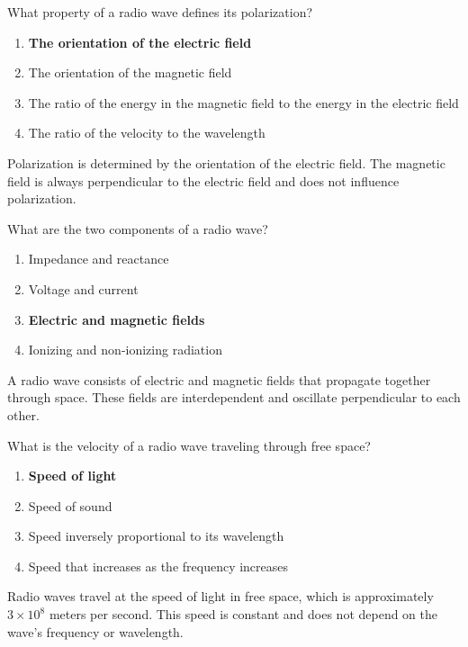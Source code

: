 \begin{tcolorbox}[colback=gray!10!white,colframe=black!75!black,title={T3B02}]
    What property of a radio wave defines its polarization?
    \begin{enumerate}[label=\Alph*,noitemsep]
        \item \textbf{The orientation of the electric field}
        \item The orientation of the magnetic field
        \item The ratio of the energy in the magnetic field to the energy in the electric field
        \item The ratio of the velocity to the wavelength
    \end{enumerate}
\end{tcolorbox}
Polarization is determined by the orientation of the electric field. The magnetic field is always perpendicular to the electric field and does not influence polarization.


\begin{tcolorbox}[colback=gray!10!white,colframe=black!75!black,title={T3B03}]
    What are the two components of a radio wave?
    \begin{enumerate}[label=\Alph*,noitemsep]
        \item Impedance and reactance
        \item Voltage and current
        \item \textbf{Electric and magnetic fields}
        \item Ionizing and non-ionizing radiation
    \end{enumerate}
\end{tcolorbox}
A radio wave consists of electric and magnetic fields that propagate together through space. These fields are interdependent and oscillate perpendicular to each other.


\begin{tcolorbox}[colback=gray!10!white,colframe=black!75!black,title={T3B04}]
    What is the velocity of a radio wave traveling through free space?
    \begin{enumerate}[label=\Alph*,noitemsep]
        \item \textbf{Speed of light}
        \item Speed of sound
        \item Speed inversely proportional to its wavelength
        \item Speed that increases as the frequency increases
    \end{enumerate}
\end{tcolorbox}
Radio waves travel at the speed of light in free space, which is approximately $3 \times 10^8$ meters per second. This speed is constant and does not depend on the wave's frequency or wavelength.

